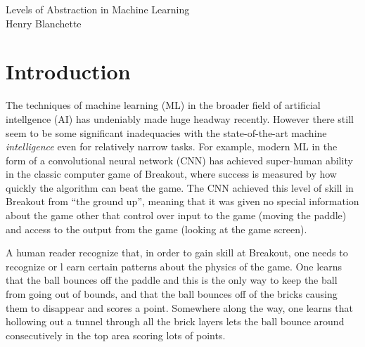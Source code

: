 \documentclass{article}
\begin{document}
\begin{center}
{\Large \sc Levels of Abstraction in Machine Learning}
\\[2em]
{\large Henry Blanchette}
\end{center}


\vspace{2em}

\section{Introduction}

The techniques of machine learning (ML) in the broader field of artificial intellgence (AI) has undeniably made huge headway recently.
However there still seem to be some significant inadequacies with the state-of-the-art machine \textit{intelligence} even for relatively narrow tasks.
For example, modern ML in the form of a convolutional neural network (CNN) has achieved super-human ability in the classic computer game of Breakout, where success is measured by how quickly the algorithm can beat the game.
The CNN achieved this level of skill in Breakout from ``the ground up'', meaning that it was given no special information about the game other that control over input to the game (moving the paddle) and access to the output from the game (looking at the game screen).

A human reader recognize that, in order to gain skill at Breakout, one needs to recognize or l earn certain patterns about the physics of the game.
One learns that the ball bounces off the paddle and this is the only way to keep the ball from going out of bounds, and that the ball bounces off of the bricks causing them to disappear and scores a point.
Somewhere along the way, one learns that hollowing out a tunnel through all the brick layers lets the ball bounce around consecutively in the top area scoring lots of points.
\end{document}
